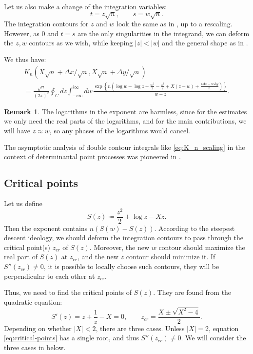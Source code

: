 \documentclass[letterpaper,11pt,oneside,reqno]{article}
\numberwithin{equation}{section}
\newcommand{\ssp}{\hspace{1pt}}
\theoremstyle{definition}
\newtheorem{remark}[proposition]{Remark}
\begin{document}
Let us also make a change of the integration variables:
\begin{equation*}
	t=z\sqrt n,\qquad s=w\sqrt n.
\end{equation*}
The integration contours for $z$ and $w$ look the same as in
, up to a rescaling. However, as $0$
and $t=s$
are the only singularities in the integrand, we can deform the $z,w$
contours as we wish, while keeping $|z|<|w|$
and the general shape as in .

We thus have:
\begin{multline}
	\label{eq:K_n_scaling}
	K_n(X\sqrt n+\Delta x/\sqrt n,X\sqrt n+\Delta y/\sqrt n)\\=
	\frac{\sqrt n}{(2\pi)^2}
	\oint_C dz\int_{-i\infty}^{i\infty}dw\ssp
	\frac{\exp
		\left\{
			n\left(
				\log w -\log z
				+\frac{w^2}{2}-\frac{z^2}{2}
				+X(z-w)+\frac{z \Delta x-w \Delta y}{n}
			\right)
		\right\}
	}{w-z}.
\end{multline}
\begin{remark}
	\label{rmk:log-harmless}
	The logarithms in the exponent are harmless, since for the
	estimates we only need the real parts of the logarithms,
	and for the main contributions, we will have $z\approx w$, so
	any phases of the logarithms would cancel.
\end{remark}

The asymptotic analysis of double contour integrals like
\eqref{eq:K_n_scaling} in the context of determinantal point processes
was pioneered in \cite[Section~3]{Okounkov2002}.

\subsection{Critical points}
\label{sub:critical-points}

Let us define
\begin{equation*}
	S(z)\coloneqq
	\frac{z^2}{2}+\log z -X z.
\end{equation*}
Then the exponent contains $n \left( S(w)-S(z) \right)$.
According to the steepest descent ideology, we
should deform the integration contours
to pass through the critical point(s) $z_{cr}$ of $S(z)$.
Moreover, the new $w$ contour should maximize the real part of $S(z)$
at $z_{cr}$, and the new $z$ contour should minimize it.
If $S''(z_{cr})\ne 0$, it is possible to locally choose such contours,
they will be perpendicular to each other at $z_{cr}$.

Thus, we need to find the critical points of $S(z)$.
They are found from the quadratic equation:
\begin{equation}
	\label{eq:critical-points}
	S'(z)=z+\frac{1}{z}-X=0,\qquad
	z_{cr}=\frac{X\pm \sqrt{X^2-4}}{2}.
\end{equation}
Depending on whether $|X|<2$, there are three cases.
Unless $|X|=2$, equation \eqref{eq:critical-points} has a single root, and
thus $S''(z_{cr})\ne 0$.
We will consider the three cases in
below.
\end{document}
